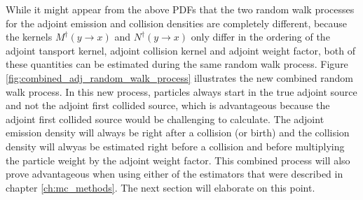 While it might appear from the above PDFs that the two random walk processes
for the adjoint emission and collision densities are completely different,
because the kernels $M^{\dagger}(y \to x)$ and $N^{\dagger}(y \to x)$ only differ
in the ordering of the adjoint tansport kernel, adjoint collision kernel and 
adjoint weight factor, both of these quantities can be estimated during the
same random walk process. Figure \ref{fig:combined_adj_random_walk_process}
illustrates the new combined random walk process. In this new process, 
particles always start in the true adjoint source and not the adjoint first
collided source, which is advantageous because the adjoint first collided 
source would be challenging to calculate. The adjoint emission density will
always be right after a collision (or birth) and the collision density will
alwyas be estimated right before a collision and before multiplying the particle
weight by the adjoint weight factor. This combined process will also prove
advantageous when using either of the estimators that were described in chapter
\ref{ch:mc_methods}. The next section will elaborate on this point.
